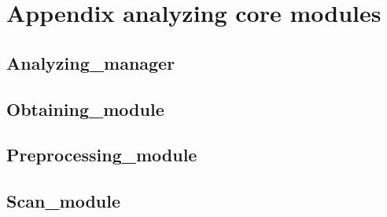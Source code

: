 \chapter{Appendix analyzing core modules}

\section{Analyzing\_manager}


\section{Obtaining\_module}


\section{Preprocessing\_module}


\section{Scan\_module}
